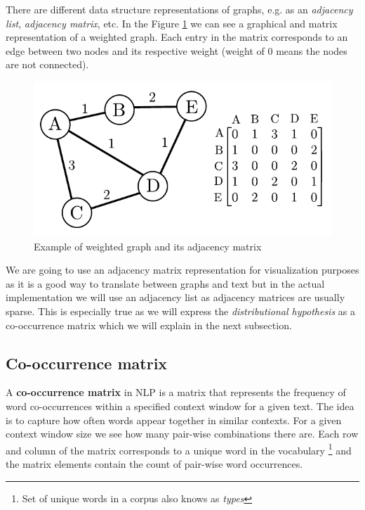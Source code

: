 \documentclass[12pt]{article}
\numberwithin{equation}{section}
\begin{document}
\begin{spacing}{1.5}
	There are different data structure representations of graphs, e.g. as an \textit{adjacency list}, \textit{adjacency matrix}, etc. In the Figure \ref{graph_adjacency} we can see a graphical and matrix representation of a weighted graph. Each entry in the matrix corresponds to an edge between two nodes and its respective weight (weight of $0$ means the nodes are not connected).
	
	\begin{figure}[H]
		\centering
		\includegraphics[scale=1.0]{graph_adjacency}		
		\caption{Example of weighted graph and its adjacency matrix}
		\label{graph_adjacency}
	\end{figure}

	We are going to use an adjacency matrix representation for visualization purposes as it is a good way to translate between graphs and text but in the actual implementation we will use an adjacency list as adjacency matrices are usually sparse. This is especially true as we will express the \textit{distributional hypothesis} as a co-occurrence matrix which we will explain in the next subsection. 
	
	\subsection{Co-occurrence matrix}
	A \textbf{co-occurrence matrix} in NLP is a matrix that represents the frequency of word co-occurrences within a specified context window for a given text. The idea is to capture how often words appear together in similar contexts. For a given context window size we see how many pair-wise combinations there are. Each row and column of the matrix corresponds to a unique word in the vocabulary \footnote{Set of unique words in a corpus also knows as \textit{types}} and the matrix elements contain the count of pair-wise word occurrences. 
	

\end{spacing}
\end{document}
